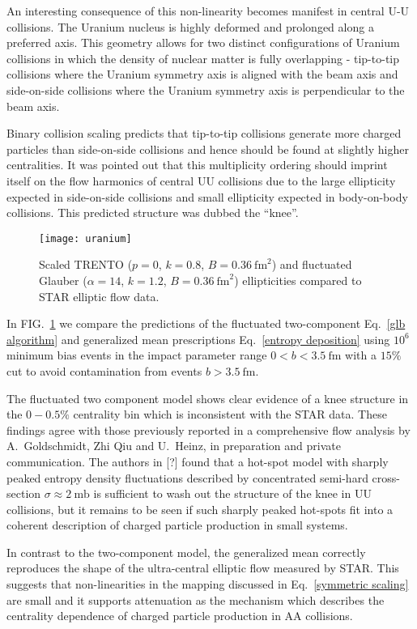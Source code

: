 \documentclass[aps,prl,reprint,amsmath,nofootinbib]{revtex4-1}
\begin{document}
An interesting consequence of this non-linearity becomes manifest in central U-U collisions. The Uranium
nucleus is highly deformed and prolonged along a preferred axis. This geometry allows for two distinct
configurations of Uranium collisions in which the density of nuclear matter is fully overlapping - tip-to-tip
collisions where the Uranium symmetry axis is aligned with the beam axis and side-on-side collisions where
the Uranium symmetry axis is perpendicular to the beam axis.

Binary collision scaling predicts that tip-to-tip collisions generate more charged particles than side-on-side
collisions and hence should be found at slightly higher centralities. It was pointed out that this
multiplicity ordering should imprint itself on the flow harmonics of central UU collisions due to the large
ellipticity expected in side-on-side collisions and small ellipticity expected in body-on-body collisions.
This predicted structure was dubbed the ``knee''.

\begin{figure}
  \centering
  \texttt{[image: uranium]}
  \caption{\label{fig:knee}Scaled TRENTO ($p=0$, $k=0.8$, $B=0.36~\mathrm{fm}^2$) and fluctuated Glauber
  ($\alpha=14$, $k=1.2$, $B=0.36~\mathrm{fm}^2$) ellipticities compared to STAR elliptic flow data.}
\end{figure}

In FIG.~\ref{fig:knee} we compare the predictions of the fluctuated two-component Eq.~\eqref{glb algorithm}
and generalized mean prescriptions Eq.~\eqref{entropy deposition} using $10^6$ minimum bias events
in the impact parameter range $0<b<3.5 ~\mathrm{fm}$ with a $15\%$ cut to avoid contamination from events
$b>3.5 ~\mathrm{fm}$.

The fluctuated two component model shows clear evidence of a knee structure in the $0-0.5\%$ centrality bin
which is inconsistent with the STAR data. These findings agree with those previously reported in a
comprehensive flow analysis by A.\ Goldschmidt, Zhi Qiu and U.\ Heinz, in preparation and private communication.
The authors in [?] found that a hot-spot model with sharply peaked entropy density fluctuations described by
concentrated semi-hard cross-section $\sigma \approx 2 ~\mathrm{mb}$ is sufficient to wash out the structure
of the knee in UU collisions, but it remains to be seen if such sharply peaked hot-spots fit into a coherent
description of charged particle production in small systems.

In contrast to the two-component model, the generalized mean correctly reproduces the shape of the
ultra-central elliptic flow measured by STAR. This suggests that non-linearities in the mapping discussed in
Eq.~\eqref{symmetric scaling} are small and it supports attenuation as the mechanism which describes the
centrality dependence of charged particle production in AA collisions.
\end{document}
